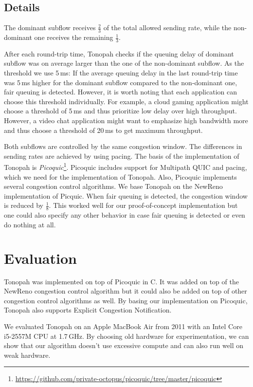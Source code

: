 \documentclass[conference]{IEEEtran}
\begin{document}
\subsection{Details}

The dominant subflow receives $\frac{2}{3}$ of the total allowed sending rate, while the non-dominant one receives the remaining $\frac{1}{3}$. 

After each round-trip time, Tonopah checks if the queuing delay of dominant subflow was on average larger than the one of the non-dominant subflow. As the threshold we use 5\,ms: If the average queuing delay in the last round-trip time was 5\,ms higher for the dominant subflow compared to the non-dominant one, fair queuing is detected. However, it is worth noting that each application can choose this threshold individually. For example, a cloud gaming application might choose a threshold of 5\,ms and thus prioritize low delay over high throughput. However, a video chat application might want to emphasize high bandwidth more and thus choose a threshold of 20\,ms to get maximum throughput. 

Both subflows are controlled by the same congestion window. The differences in sending rates are achieved by using pacing. 
The basis of the implementation of Tonopah is \textit{Picoquic}\footnote{\url{https://github.com/private-octopus/picoquic/tree/master/picoquic}}. 
Picoquic includes support for Multipath QUIC and pacing, which we need for the implementation of Tonopah. Also, Picoquic implements several congestion control algorithms. 
We base Tonopah on the NewReno implementation of Picquic. When fair queuing is detected, the congestion window is reduced by $\frac{1}{8}$. 
This worked well for our proof-of-concept implementation but one could also specify any other behavior in case fair queuing is detected or even do nothing at all. 

\section{Evaluation}

Tonopah was implemented on top of Picoquic in C. It was added on top of the NewReno congestion control algorithm but it could also be added on top of other 
congestion control algorithms as well. By basing our implementation on Picoquic, Tonopah also supports Explicit Congestion Notification. 

We evaluated Tonopah on an Apple MacBook Air from 2011 with an Intel Core i5-2557M CPU at 1.7\,GHz. 
By choosing old hardware for experimentation, we can show that our algorithm doesn't use excessive compute and can also run well on weak hardware. 
\end{document}
